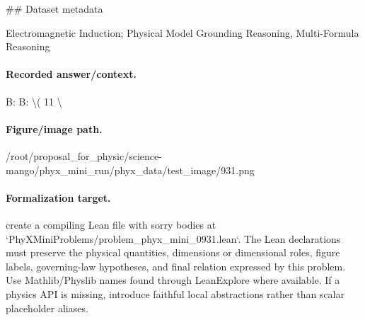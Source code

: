 \#\# Dataset metadata

Electromagnetic Induction; Physical Model Grounding Reasoning, Multi-Formula Reasoning

\paragraph{Recorded answer/context.}
B: B: \textbackslash{}( 11 \textbackslash{}

\paragraph{Figure/image path.}
/root/proposal\_for\_physic/science-mango/phyx\_mini\_run/phyx\_data/test\_image/931.png

\paragraph{Formalization target.}
create a compiling Lean file with sorry bodies at `PhyXMiniProblems/problem\_phyx\_mini\_0931.lean`. The Lean declarations must preserve the physical quantities, dimensions or dimensional roles, figure labels, governing-law hypotheses, and final relation expressed by this problem.
Use Mathlib/Physlib names found through LeanExplore where available. If a physics API is missing, introduce faithful local abstractions rather than scalar placeholder aliases.

